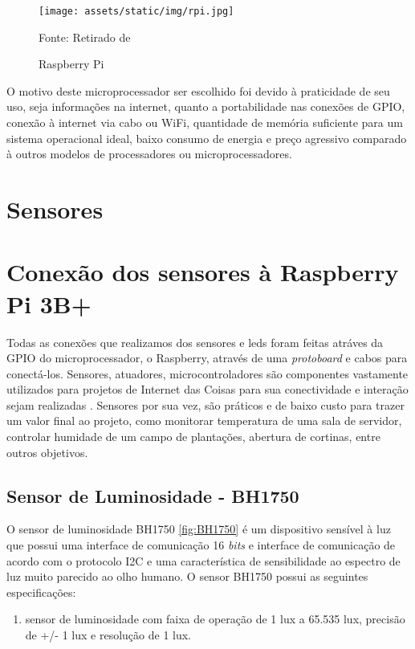 \documentclass[../../layout.tex]{subfiles}
\begin{document}
\begin{figure}[H]
\centering
\caption{Raspberry Pi}
\texttt{[image: assets/static/img/rpi.jpg]}
\label{fig:rpi}

\begin{minipage}{0.5\textwidth}
\raggedright \footnotesize Fonte: Retirado de 
\end{minipage}
\end{figure}

\hspace*{3em}O motivo deste microprocessador ser escolhido foi devido à praticidade de seu uso, seja informações na internet, quanto a portabilidade nas conexões de GPIO, conexão à internet via cabo ou WiFi, quantidade de memória suficiente para um sistema operacional ideal, baixo consumo de energia e preço agressivo comparado à outros modelos de processadores ou microprocessadores.

\section{Sensores}
\section{Conexão dos sensores à Raspberry Pi 3B+}
\hspace*{3em}Todas as conexões que realizamos dos sensores e leds foram feitas atráves da GPIO do microprocessador, o Raspberry, através de uma \emph{protoboard} e cabos para conectá-los.
\hspace*{3em}Sensores, atuadores, microcontroladores são componentes vastamente utilizados para projetos de Internet das Coisas para sua conectividade e interação sejam realizadas \cite{sensores_iot}. Sensores por sua vez, são práticos e de baixo custo para trazer um valor final ao projeto, como monitorar temperatura de uma sala de servidor, controlar humidade de um campo de plantações, abertura de cortinas, entre outros objetivos.
\subsection{Sensor de Luminosidade - BH1750}
\hspace*{3em}O sensor de luminosidade BH1750 \ref{fig:BH1750} é um dispositivo sensível à luz que possui uma interface de comunicação 16 \emph{bits} e interface de comunicação de acordo com o protocolo I2C e uma característica de sensibilidade ao espectro de luz muito parecido ao olho humano.
\hspace*{3em}O sensor BH1750 possui as seguintes especificações:
\begin{enumerate}[label=\alph*)]
\itemsep0em
    \item sensor de luminosidade com faixa de operação de 1 lux a 65.535 lux, precisão de +/- 1 lux e resolução de 1 lux.
\end{enumerate}
\end{document}
